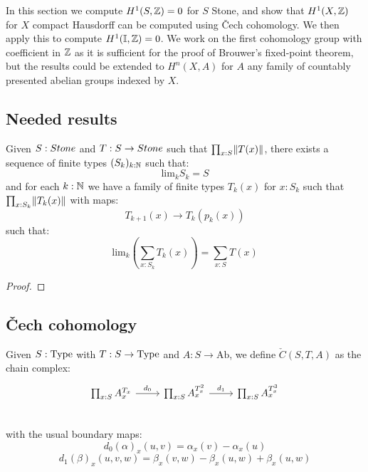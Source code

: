 In this section we compute $H^1(S,\mathbb{Z}) = 0$ for $S$ Stone, and show that $H^1(X,\mathbb{Z})$ for $X$ compact Hausdorff can be computed using \v{C}ech cohomology. We then apply this to compute $H^1(\mathbb{I},\mathbb{Z})=0$. We work on the first cohomology group with coefficient in $\mathbb{Z}$ as it is sufficient for the proof of Brouwer's fixed-point theorem, but the results could be extended to $H^n(X,A)$ for $A$ any family of countably presented abelian groups indexed by $X$.

\subsection{Needed results}


\begin{lemma}\label{finite-approximation-surjection-stone}
Given $S:\Stone$ and $T:S\to\Stone$ such that $\prod_{x:S}\lVert T(x) \rVert$, there exists a sequence of finite types $(S_k)_{k:\mathbb{N}}$
such that: 
\[\mathrm{lim}_kS_k = S\] 
and for each $k:\mathbb{N}$ we have a family of finite types $T_k(x)$ for $x:S_k$ such that $\prod_{x:S_k}\lVert T_k(x) \rVert$ with maps:
\[T_{k+1}(x) \to T_k(p_k(x))\]
such that:
\[\mathrm{lim}_k\left(\sum_{x:S_k}T_k(x)\right) = \sum_{x:S}T(x)\]
\end{lemma}

\begin{proof}
\end{proof}


\subsection{\v{C}ech cohomology}

\begin{definition}
Given $S:\mathrm{Type}$ with $T:S\to \mathrm{Type}$ and $A:S\to\mathrm{Ab}$, we define $\check{C}(S,T,A)$ as the chain complex:
\begin{equation}
\begin{tikzcd}
     \prod_{x:S}A_x^{T_x} \ar[r,"d_0"] & \prod_{x:S}A_x^{T_x^2}\ar[r,"d_1"] &  \prod_{x:S}A_x^{T_x^3}\\
\end{tikzcd}
\end{equation}
with the usual boundary maps:
\[d_0(\alpha)_x(u,v) = \alpha_x(v)-\alpha_x(u)\]
\[d_1(\beta)_x(u,v,w) = \beta_x(v,w) - \beta_x(u,w) + \beta_x(u,w)\]
\end{definition}

